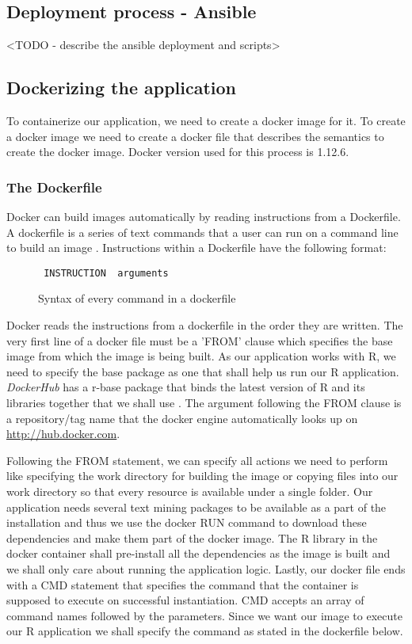 \documentclass[9pt,twocolumn,twoside]{../../styles/osajnl}
\begin{document}
\subsection{Deployment process - Ansible}
<TODO - describe the ansible deployment and scripts>

\subsection{Dockerizing the application}
To containerize our application, we need to create a docker image for
it. To create a docker image we need to create a docker file that
describes the semantics to create the docker image. Docker version
used for this process is 1.12.6.

\subsubsection{The Dockerfile}
Docker can build images automatically by reading instructions from a
Dockerfile. A dockerfile is a series of text commands that a user can
run on a command line to build an image \cite{www-dockerfile-documentation}.
\newline
Instructions within a Dockerfile have the following format:
\begin{figure}[H]
\begin{verbatim}
 INSTRUCTION  arguments
\end{verbatim}
\caption{Syntax of every command in a dockerfile}
\label{Syntax of every command in a dockerfile}
\end{figure}

Docker reads the instructions from a dockerfile in the order they are
written. The very first line of a docker file must be a 'FROM' clause
which specifies the base image from which the image is being built. As
our application works with R, we need to specify the base package as
one that shall help us run our R application. \emph{DockerHub} has a
r-base package that binds the latest version of R and its libraries
together that we shall use \cite{www-rbase-docker}.  The argument
following the FROM clause is a repository/tag name that the docker
engine automatically looks up on \url{http://hub.docker.com}.

Following the FROM statement, we can specify all actions we need to
perform like specifying the work directory for building the image or
copying files into our work directory so that every resource is
available under a single folder. Our application needs several text
mining packages to be available as a part of the installation and thus
we use the docker RUN command to download these dependencies and make
them part of the docker image. The R library in the docker container
shall pre-install all the dependencies as the image is built and we
shall only care about running the application logic. Lastly, our
docker file ends with a CMD statement that specifies the command that
the container is supposed to execute on successful instantiation. CMD
accepts an array of command names followed by the parameters. Since we
want our image to execute our R application we shall specify the command
as stated in the dockerfile below.
\end{document}
